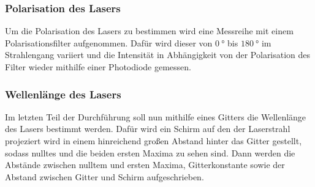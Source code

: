 \subsubsection{Polarisation des Lasers}
\label{sec:polari}
Um die Polarisation des Lasers zu bestimmen wird eine Messreihe mit einem Polarisationsfilter aufgenommen. Dafür wird dieser von $\SI{0}{\degree}$ bis $\SI{180}{\degree}$ im Strahlengang variiert und die Intensität in Abhängigkeit von der Polarisation des Filter wieder mithilfe einer Photodiode gemessen.
\subsubsection{Wellenlänge des Lasers}
Im letzten Teil der Durchführung soll nun mithilfe eines Gitters die Wellenlänge des Lasers bestimmt werden. Dafür wird ein Schirm auf den der Laserstrahl projeziert wird in einem hinreichend großen Abstand hinter das Gitter gestellt, sodass nulltes und die beiden ersten Maxima zu sehen sind. Dann werden die Abstände zwischen nulltem und ersten Maxima, Gitterkonstante sowie der Abstand zwischen Gitter und Schirm aufgeschrieben.
